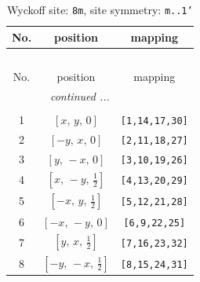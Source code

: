 \documentclass[fleqn,8pt]{jsarticle}
\begin{document}
\begin{longtable}{ccc}
\caption{Wyckoff site: {\tt 8m}, site symmetry: {\tt m..1'}}
 \\
 \hline \hline
No. & position & mapping \\ \hline \endfirsthead

\multicolumn{2}{l}{\tablename\ \thetable{}} \\
 \hline \hline
No. & position & mapping \\ \hline \endhead

 \hline \hline
\multicolumn{2}{r}{\footnotesize\it continued ...} \\ \endfoot

 \hline \hline
\multicolumn{2}{r}{} \\ \endlastfoot

1 & $\left[ x,\, y,\, 0 \right]$ & {\tt [1,14,17,30]} \\ \hline
2 & $\left[ - y,\, x,\, 0 \right]$ & {\tt [2,11,18,27]} \\ \hline
3 & $\left[ y,\, - x,\, 0 \right]$ & {\tt [3,10,19,26]} \\ \hline
4 & $\left[ x,\, - y,\, \frac{1}{2} \right]$ & {\tt [4,13,20,29]} \\ \hline
5 & $\left[ - x,\, y,\, \frac{1}{2} \right]$ & {\tt [5,12,21,28]} \\ \hline
6 & $\left[ - x,\, - y,\, 0 \right]$ & {\tt [6,9,22,25]} \\ \hline
7 & $\left[ y,\, x,\, \frac{1}{2} \right]$ & {\tt [7,16,23,32]} \\ \hline
8 & $\left[ - y,\, - x,\, \frac{1}{2} \right]$ & {\tt [8,15,24,31]} \\
\end{longtable}
\renewcommand{\arraystretch}{1.2}
\end{document}
